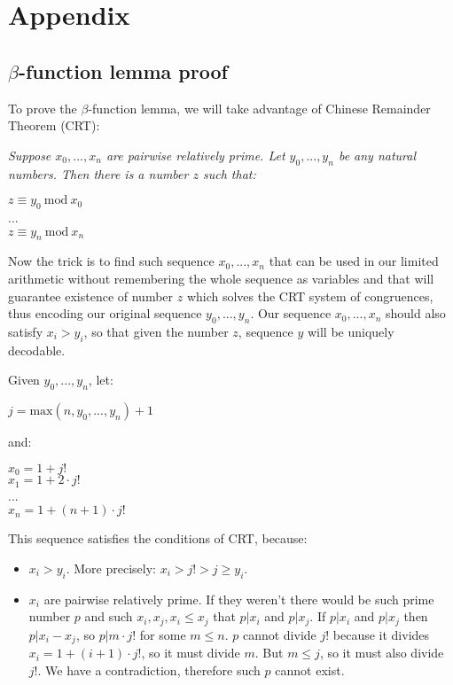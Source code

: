 \documentclass{article}
\begin{document}
\section{Appendix}

\subsection{$\beta$-function lemma proof}

To prove the $\beta$-function lemma, we will take advantage of Chinese Remainder Theorem (CRT):

\begin{center}
    \textit{
        Suppose $x_0, ..., x_n$ are pairwise relatively prime. Let $y_0, ..., y_n$ be any natural numbers.
        Then there is a number $z$ such that:
    }

    $z \equiv y_0\ \text{mod}\ x_0$\\
    ...\\
    $z \equiv y_n\ \text{mod}\ x_n$
\end{center}

Now the trick is to find such sequence $x_0, ..., x_n$ that can be used in our limited arithmetic
without remembering the whole sequence as variables and that will guarantee existence of number $z$
which solves the CRT system of congruences, thus encoding our original sequence $y_0, ..., y_n$.
Our sequence $x_0, ..., x_n$ should also satisfy $x_i > y_i$, so that given the number $z$,
sequence $y$ will be uniquely decodable.

Given $y_0, ..., y_n$, let:

\begin{center}
    $j = \text{max}(n, y_0, ..., y_n) + 1$
\end{center}

and:

\begin{center}
    $x_0 = 1 + j!$\\
    $x_1 = 1 + 2 \cdot j!$\\
    ...\\
    $x_n = 1 + (n + 1) \cdot j!$
\end{center}

This sequence satisfies the conditions of CRT, because:

\begin{itemize}
    \item $x_i > y_i$. More precisely: $x_i > j! > j \geqslant y_i$.
    \item $x_i$ are pairwise relatively prime. If they weren't there would be such prime number $p$
        and such $x_i, x_j, x_i \leq x_j$ that $p | x_i$ and $p | x_j$. If $p | x_i$ and $p | x_j$
        then $p | x_i - x_j$, so $p | m \cdot j!$ for some $m \leqslant n$. $p$ cannot divide $j!$
        because it divides $x_i = 1 + (i+1) \cdot j!$, so it must divide $m$. But $m \leqslant j$,
        so it must also divide $j!$. We have a contradiction, therefore such $p$ cannot exist.
\end{itemize}
\end{document}
